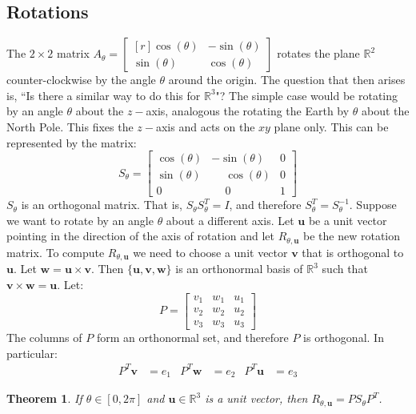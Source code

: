 \documentclass{article}
\theoremstyle{mystyle}
\newtheorem{theorem}{Theorem}[section]
\begin{document}
\subsection{Rotations}
The $2\times 2$ matrix $A_{\theta} = \begin{bmatrix*}[r] \cos(\theta) & -\sin(\theta) \\ \sin(\theta) & \cos(\theta)\end{bmatrix*}$ rotates the plane $\mathbb{R}^2$ counter-clockwise by the angle $\theta$ around the origin. The question that then arises is, ``Is there a similar way to do this for $\mathbb{R}^3$"? The simple case would be rotating by an angle $\theta$ about the $z-$axis, analogous the rotating the Earth by $\theta$ about the North Pole. This fixes the $z-$axis and acts on the $xy$ plane only. This can be represented by the matrix:
\begin{equation*}
 S_{\theta} = \begin{bmatrix*} \cos(\theta) & -\sin(\theta) & 0 \\ \sin(\theta) & \phantom{-}\cos(\theta) & 0\\ 0 & \phantom{-}0 & 1 \end{bmatrix*}   
\end{equation*}
$S_{\theta}$ is an orthogonal matrix. That is, $S_{\theta} S_{\theta}^T = I$, and therefore $S_{\theta}^T = S_{\theta}^{-1}$. Suppose we want to rotate by an angle $\theta$ about a different axis. Let $\mathbf{u}$ be a unit vector pointing in the direction of the axis of rotation and let $R_{\theta,\mathbf{u}}$ be the new rotation matrix. To compute $R_{\theta,\mathbf{u}}$ we need to choose a unit vector $\mathbf{v}$ that is orthogonal to $\mathbf{u}$. Let $\mathbf{w} = \mathbf{u}\times \mathbf{v}$. Then $\{\mathbf{u},\mathbf{v},\mathbf{w}\}$ is an orthonormal basis of $\mathbb{R}^3$ such that $\mathbf{v}\times \mathbf{w} = \mathbf{u}$. Let:
\begin{equation*}
    P = \begin{bmatrix} v_1 & w_1 & u_1 \\ v_2 & w_2 & u_2 \\ v_3 & w_3 & u_3 \end{bmatrix}
\end{equation*}
The columns of $P$ form an orthonormal set, and therefore $P$ is orthogonal. In particular:
\begin{align*}
    P^{T}\mathbf{v} &= e_{1} & P^{T}\mathbf{w} &= e_{2} & P^{T}\mathbf{u} &= e_{3}
\end{align*}
\begin{theorem}
If $\theta \in [0,2\pi]$ and $\mathbf{u}\in \mathbb{R}^3$ is a unit vector, then $R_{\theta, \mathbf{u}} = PS_{\theta}P^T$.
\end{theorem}
\end{document}
